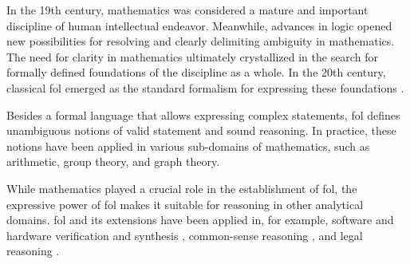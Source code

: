 
In the 19th century, mathematics was considered a mature and important discipline of human intellectual endeavor.
Meanwhile,
advances in logic opened new possibilities
for resolving
and clearly delimiting ambiguity in mathematics.
The need for clarity in mathematics
ultimately crystallized in the search for formally defined foundations of the discipline as a whole.
In the 20th century,
classical \gls{fol} emerged as the standard formalism for expressing these foundations \cite{DBLP:journals/bsl/Ferreiros01}.


Besides a formal language that allows expressing complex statements,
\gls{fol} defines unambiguous notions of valid statement and sound reasoning.
In practice, these notions have been applied in various sub-domains of mathematics, such as arithmetic, group theory, and graph theory.

While mathematics played a crucial role in the establishment of \gls{fol},
the expressive power of \gls{fol} makes it suitable for reasoning in other analytical domains.
\Gls{fol} and its extensions have been applied in, for example, software and hardware verification and synthesis
\cite{
DBLP:journals/tcad/DSilvaKW08, %
DBLP:series/lncs/10001}, %
common-sense reasoning \cite{DBLP:conf/cade/PeaseS07}, and
legal reasoning \cite{DBLP:journals/logcom/PrakkenWBA15,
DBLP:conf/atal/LibalN21}.

